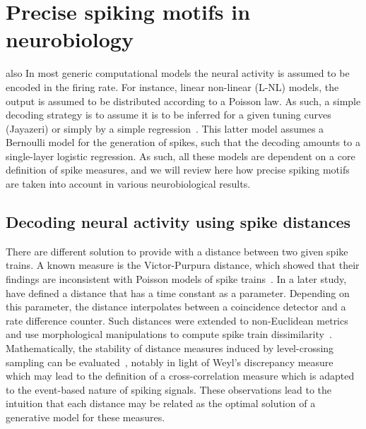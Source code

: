 \documentclass[brainsci, %
               review,submit,pdftex,moreauthors%
               ]{Definitions/mdpi}
\begin{document}
 \section{Precise spiking motifs in neurobiology}
also
%
In most generic computational models the neural activity is assumed to be encoded in the firing rate. For instance, linear non-linear (L-NL) models, the output is assumed to be distributed according to a Poisson law. As such, a simple decoding strategy is to assume it is to be inferred for a given tuning curves (Jayazeri) or simply by a simple regression~\citep{berens_fast_2012}. This latter model assumes a Bernoulli model for the generation of spikes, such that the decoding amounts to a single-layer logistic regression. As such, all these models are dependent on  a core definition of spike measures, and we will review here how precise spiking motifs are taken into account in various neurobiological results.
%
\subsection{Decoding neural activity using spike distances}\label{sec:discussion}
There are different solution to provide with a distance between two given spike trains. A known measure is the Victor-Purpura distance, which showed that their findings are inconsistent with Poisson models of spike trains~\citep{victor_nature_1996}. In a later study,~\citet{van_rossum_novel_2001} have defined a distance that has a time constant as a parameter. Depending on this parameter, the distance interpolates between a coincidence detector and a rate difference counter. Such distances were extended to non-Euclidean metrics~\citep{} and use morphological manipulations to compute spike train dissimilarity~\citet{kruz}. Mathematically, the stability of distance measures induced by level-crossing sampling can be evaluated~\citep{moser_stability_2014}, notably in light of Weyl's discrepancy measure~\citep{weyl_ber_1916} which may lead to the definition of a cross-correlation measure which is adapted to the event-based nature of spiking signals. These observations lead to the intuition that each distance may be related as the optimal solution of a generative model for these measures.
\end{document}
